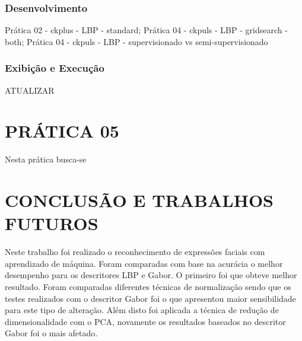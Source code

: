 \documentclass[a4paper, 12 pt, conference]{ieeeconf}  %
\begin{document}
\subsubsection{Desenvolvimento} Prática 02 - ckplus  - LBP - standard; Prática 04 - ckpuls - LBP - gridsearch - both; Prática 04 - ckpuls - LBP - supervisionado vs  semi-supervisionado
\subsubsection{Exibição e Execução} ATUALIZAR

\section{PRÁTICA 05}
\label{pratica05}

Nesta prática busca-se
\section{CONCLUSÃO E TRABALHOS FUTUROS}

Neste trabalho foi realizado o reconhecimento de expressões faciais com aprendizado de máquina. Foram comparadas com base na acurácia o melhor desempenho para os descritores LBP e Gabor. O primeiro foi que obteve melhor resultado. Foram comparadas diferentes técnicas de normalização sendo que os testes realizados com o descritor Gabor foi o que apresentou maior sensibilidade para este tipo de alteração. Além disto foi aplicada a técnica de redução de dimensionalidade com o PCA, novamente os resultados baseados no descritor Gabor foi o mais afetado.

%

\end{document}
